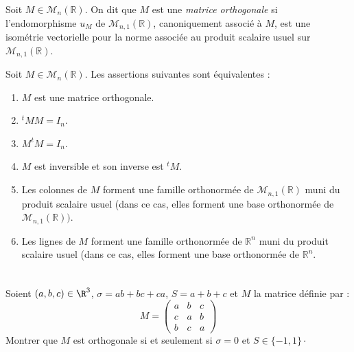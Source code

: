 \documentclass[french,11pt,twoside]{VcCours}
\begin{document}
\begin{Definition}{} Soit $M \in \mathcal{M}_n(\mathbb{R})$. On dit que $M$ est une \emph{matrice orthogonale} si l'endomorphisme $u_M$ de $\mathcal{M}_{n,1}(\mathbb{R})$, canoniquement associé à $M$, est une isométrie vectorielle pour la norme associée au produit scalaire usuel sur $\mathcal{M}_{n,1}(\mathbb{R})$.
\end{Definition}

\begin{Proposition}{} Soit $M \in \mathcal{M}_n(\mathbb{R})$. Les assertions suivantes sont équivalentes :
\begin{enumerate}
\item $M$ est une matrice orthogonale.
\item $^tM M=I_n$.
\item $M ^tM=I_n$.
\item $M$ est inversible et son inverse est $^tM$.
\item Les colonnes de $M$ forment une famille orthonormée de $\mathcal{M}_{n,1}(\mathbb{R})$ muni du produit scalaire usuel (dans ce cas, elles forment une base orthonormée de $\mathcal{M}_{n,1}(\mathbb{R}))$.
\item Les lignes de $M$ forment une famille orthonormée de $\mathbb{R}^n$ muni du produit scalaire usuel (dans ce cas, elles forment une base orthonormée de $\mathbb{R}^n$.
\end{enumerate}
\end{Proposition}

\begin{Demonstration}{}

\vspace{7cm}
\end{Demonstration}

\newpage

$\phantom{test}$

\vspace{5cm}

\begin{ApplicationDirecte}{} Soient $(a,b,c) \in \R^{3}$, $\sigma = ab + bc + ca$, $S = a + b + c$ et $M$ la matrice définie par :
  \[
  M =
  \begin{pmatrix}
    a & b & c \\
    c & a & b \\
    b & c & a
  \end{pmatrix}
  \]
Montrer que $M$ est orthogonale si et seulement si  $\sigma = 0$ et $S \in \lbrace -1,1 \rbrace\cdot$
\end{ApplicationDirecte}
 
\end{document}
